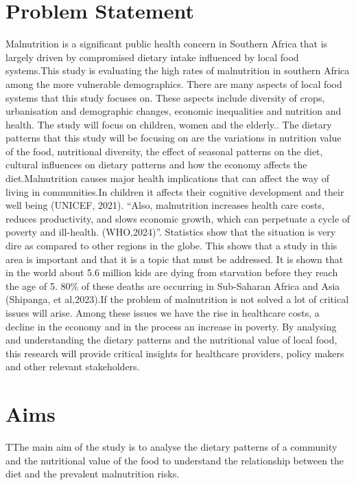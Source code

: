 \documentclass[a4paper,11pt]{report}
\begin{document}
	\section{Problem Statement}
	Malnutrition is a significant public health concern in Southern Africa that is largely driven by compromised dietary intake influenced by local food systems.This study is evaluating the high rates of malnutrition in southern Africa among the more vulnerable demographics. There are many aspects of local food systems that this study focuses on. These aspects include diversity of crops, urbanisation and demographic changes, economic inequalities and nutrition and health. The study will focus on children, women and the elderly.. The dietary patterns that this study will be focusing on are the variations in nutrition value of the food, nutritional diversity, the effect of seasonal patterns on the diet, cultural influences on dietary patterns and how the economy affects the diet.Malnutrition causes major health implications that can affect the way of living in communities.In children it affects their cognitive development and their well being (UNICEF, 2021). “Also, malnutrition increases health care costs, reduces productivity, and slows economic growth, which can perpetuate a cycle of poverty and ill-health. (WHO,2024)”. Statistics show that the situation is very dire as compared to other regions in the globe. This shows that a study in this area is important and that it is a topic that must be addressed. It is shown that in the world about 5.6 million kids are dying from starvation before they reach the age of 5. 80\% of these deaths are occurring in Sub-Saharan Africa and Asia (Shipanga, et al,2023).If the problem of malnutrition is not solved a lot of critical issues will arise. Among these issues we have the rise in healthcare costs, a decline in the economy and in the process an increase in poverty. By analysing and understanding  the dietary patterns and the nutritional value of local food, this research will provide critical insights for healthcare providers, policy makers and other relevant stakeholders.
	
	\section{Aims}
	TThe main aim of the study is to analyse the dietary patterns of a community and the nutritional value of the food to understand the relationship between the diet and the prevalent malnutrition risks.
	
\end{document}
